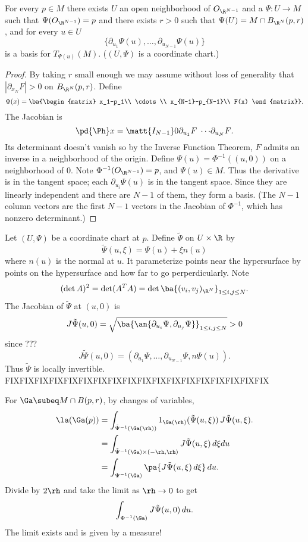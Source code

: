 \begin{pr}
For every $p\in M$ there exists $U$ an open neighborhood of $O_{\R^{N-1}}$ and a $\Psi:U\to M$ such that $\Psi(O_{\R^{N-1}})=p$ and there exists $r>0$ such that $\Psi(U)=M\cap B_{\R^N}(p,r)$, and for every $u\in U$
\[
\{\partial_{u_1}\Psi(u),\ldots, \partial_{u_{N-1}}\Psi(u)\}
\]
is a basis for $T_{\Psi(u)}(M)$.
($(U,\Psi)$ is a coordinate chart.)
\end{pr}
\begin{proof}
By taking $r$ small enough we may assume without loss of generality that $|\partial_{x_N}F|>0$ on $B_{\R^N} (p,r)$. Define
\[
\Phi(x)=\ba{\begin{matrix}
x_1-p_1\\
\cdots \\
x_{N-1}-p_{N-1}\\
F(x)
\end{matrix}}.
\]
The Jacobian is
\[
\pd{\Ph}x=\matt{I_{N-1}}0{\partial_{u_1}F\; \cdots }{\partial_{u_N}F}.
\]
Its determinant doesn't vanish so by the Inverse Function Theorem, $F$ admits an inverse in a neighborhood of the origin. Define $\Psi(u)=\Phi^{-1}((u,0))$ on a neighborhood of 0. Note $\Phi^{-1}(O_{\R^{N-1}})=p$, and $\Psi(u)\in M$. Thus the derivative is in the tangent space; each $\partial_{u_i} \Psi(u)$ is in the tangent space. Since they are linearly independent and there are $N-1$ of them, they form a basis. (The $N-1$ column vectors are the first $N-1$ vectors in the Jacobian of $\Phi^{-1}$, which has nonzero determinant.)
\end{proof}
Let $(U,\Psi)$  be a coordinate chart at $p$. Define $\tilde{\Psi}$ on $U\times \R$ by
\[
\tilde{\Psi}(u,\xi)= \Psi(u)+\xi n(u)
\]
where $n(u)$ is the normal at $u$. 
It parameterize points near the hypersurface by points on the hypersurface and how far to go perperdicularly. %
Note
\[
(\det A)^2=\det(A^TA)=\det\ba{(v_i,v_j)_{\R^N}}_{1\le i,j\le N}.
\]
The Jacobian of $\tilde{\Psi}$  at $(u,0)$ is 
\[
J\tilde{\Psi}(u,0)=\sqrt{
\ba{
\an{\partial_{u_i}\Psi, \partial_{u_j}\Psi}
}_{1\le i,j\le N}
}>0
\]
since ???
\[
J\tilde{\Psi}(u,0)=(\partial_{u_1}\Psi,\ldots, \partial_{u_{N-1}} \Psi, n \Psi(u)).
\]
Thus $\tilde{\Psi}$ is locally invertible.
FIXFIXFIXFIXFIXFIXFIXFIXFIXFIXFIXFIXFIXFIXFIXFIXFIXFIX

For $\Ga\subeq  M\cap B(p,r)$, 
by changes of variables, 
\begin{align*}
\la(\Ga(p))&=\int_{\tilde{\Psi}^{-1}(\Ga(\rh))} 1_{\Ga(\rh)}(\tilde{\Psi}(u,\xi))\,J\tilde{\Psi}(u,\xi).\\
&=\int_{\tilde{\Psi}^{-1}(\Ga)\times (-\rh,\rh)} J\tilde{\Psi}(u,\xi)\,d\xi du\\
&=\int_{\Psi^{-1}(\Ga)}
\pa{
J\tilde{\Psi}(u,\xi)\,d\xi
}\,du.
\end{align*}
Divide by $2\rh$ and take the limit as $\rh\to 0$ to get
\[
\int_{\Phi^{-1}(\Ga)} J\tilde{\Psi}(u,0)\,du.
\]
The limit exists and is given by a measure!

